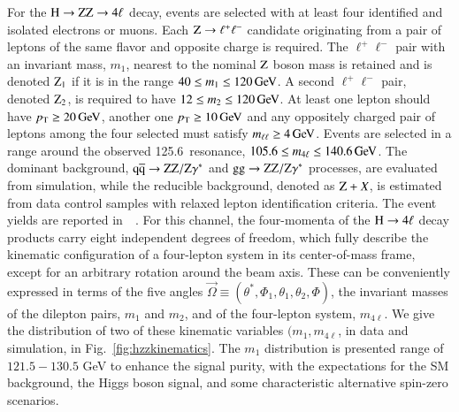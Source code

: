 For the $\mathrm{H}\to\mathrm{Z}\mathrm{Z}\to4\ell$ decay, events are selected with at
least four identified and isolated electrons or muons.  Each $\mathrm{Z}\to
\ell^+\ell^-$ candidate originating from a pair of leptons of the same
flavor and opposite charge is required.  The $\ell^+\ell^-$ pair with
an invariant mass, $m_1$, nearest to the nominal $\mathrm{Z}$ boson mass is
retained and is denoted $\mathrm{Z}_{1}$ if it is in the range $40 \le m_1
\le 120 \,\mathrm{Ge\hspace{-.08em}V}$.  A second $\ell^{+}\ell^{-}$ pair, denoted $\mathrm{Z}_{2}$,
is required to have $12 \le m_2 \le 120 \,\mathrm{Ge\hspace{-.08em}V}$.  At least one lepton
should have $p_{\mathrm{T}} \ge 20 \,\mathrm{Ge\hspace{-.08em}V}$, another one $p_{\mathrm{T}} \ge 10 \,\mathrm{Ge\hspace{-.08em}V}$ and any
oppositely charged pair of leptons among the four selected must
satisfy $m_{\ell\ell} \ge 4 \,\mathrm{Ge\hspace{-.08em}V}$. Events are selected in a range
around the observed 125.6~\GeV resonance, $105.6 \le m_{4\ell} \le
140.6 \,\mathrm{Ge\hspace{-.08em}V}$.
%
The dominant background, $\mathrm{q}\mathrm{\overline{q}} \to \mathrm{Z}\mathrm{Z}/\mathrm{Z}\gamma^*$ and $\mathrm{g}\mathrm{g} \to
\mathrm{Z}\mathrm{Z}/\mathrm{Z}\gamma^*$ processes, are evaluated from simulation, while the
reducible background, denoted as $\mathrm{Z} + X$, is estimated from data
control samples with relaxed lepton identification criteria.
%
The event yields are reported in~~\cite{Chatrchyan:2013mxa}.
%
For this channel, the four-momenta of the $\mathrm{H} \rightarrow
4\mathrm{\ell}$ decay products carry eight independent degrees of
freedom, which fully describe the kinematic configuration of a
four-lepton system in its center-of-mass frame, except for an
arbitrary rotation around the beam axis. These can be conveniently
expressed in terms of the five angles $\vec\Omega\equiv(\theta^*,
\Phi_1, \theta_1, \theta_2, \Phi)$, the invariant masses of the
dilepton pairs, $m_{1}$ and $m_{2}$, and of the four-lepton system,
$m_{4\ell}$.  We give the distribution of two of these kinematic
variables $(m_1, m_{4\ell}$, in data and simulation, in
Fig.~\ref{fig:hzzkinematics}. The $m_1$ distribution is presented
range of $121.5 - 130.5$ GeV to enhance the signal purity, with the
expectations for the SM background, the Higgs boson signal, and some
characteristic alternative spin-zero scenarios.

